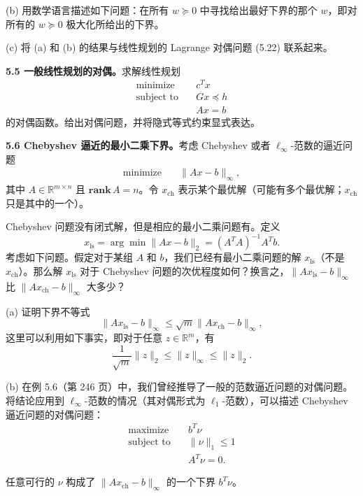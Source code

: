 \documentclass[UTF8,12pt,a4paper,fontset=fandol]{ctexart}
\begin{document}
(b) 用数学语言描述如下问题：在所有 $w\succeq 0$ 中寻找给出最好下界的那个 $w$，即对所有的 $w\succeq 0$ 极大化所给出的下界。

(c) 将 (a) 和 (b) 的结果与线性规划的 Lagrange 对偶问题 (5.22) 联系起来。

\noindent\textbf{5.5 一般线性规划的对偶。}\quad 求解线性规划
\[
\begin{aligned}
\text{minimize}\quad & c^Tx\\
\text{subject to}\quad & Gx\preceq h\\
& Ax=b
\end{aligned}
\]
的对偶函数。给出对偶问题，并将隐式等式约束显式表达。

\noindent\textbf{5.6 Chebyshev 逼近的最小二乘下界。}\quad 考虑 Chebyshev 或者 $\ell_\infty$-范数的逼近问题
\begin{equation}
\begin{aligned}
\text{minimize}\quad & \|Ax-b\|_\infty,
\end{aligned}
\tag{5.103}
\end{equation}
其中 $A\in\mathbb{R}^{m\times n}$ 且 $\mathbf{rank}\,A=n$。令 $x_{\mathrm{ch}}$ 表示某个最优解（可能有多个最优解；$x_{\mathrm{ch}}$ 只是其中的一个）。

Chebyshev 问题没有闭式解，但是相应的最小二乘问题有。定义
\[
x_{\mathrm{ls}}=\arg\min \|Ax-b\|_2=(A^TA)^{-1}A^Tb.
\]
考虑如下问题。假定对于某组 $A$ 和 $b$，我们已经有最小二乘问题的解 $x_{\mathrm{ls}}$（不是 $x_{\mathrm{ch}}$）。那么解 $x_{\mathrm{ls}}$ 对于 Chebyshev 问题的次优程度如何？换言之，$\|Ax_{\mathrm{ls}}-b\|_\infty$ 比 $\|Ax_{\mathrm{ch}}-b\|_\infty$ 大多少？

(a) 证明下界不等式
\[
\|Ax_{\mathrm{ls}}-b\|_\infty\leq \sqrt{m}\|Ax_{\mathrm{ch}}-b\|_\infty,
\]
这里可以利用如下事实，即对于任意 $z\in\mathbb{R}^m$，有
\[
\frac{1}{\sqrt{m}}\|z\|_2\leq \|z\|_\infty\leq \|z\|_2.
\]

(b) 在例 5.6（第 246 页）中，我们曾经推导了一般的范数逼近问题的对偶问题。将结论应用到 $\ell_\infty$-范数的情况（其对偶形式为 $\ell_1$-范数），可以描述 Chebyshev 逼近问题的对偶问题：
\begin{equation}
\begin{aligned}
\text{maximize}\quad & b^T\nu\\
\text{subject to}\quad & \|\nu\|_1\leq 1\\
& A^T\nu=0.
\end{aligned}
\tag{5.104}
\end{equation}

任意可行的 $\nu$ 构成了 $\|Ax_{\mathrm{ch}}-b\|_\infty$ 的一个下界 $b^T\nu$。
\end{document}
